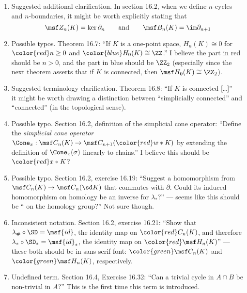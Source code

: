 \documentclass{fkletter}
\begin{document}
\begin{enumerate}
  \item Suggested additional clarification. In section 16.2, when we define
    $n$-cycles and $n$-boundaries, it might be worth explicitly stating that
    \[
      \msf Z_n(K) = \ker \partial_n \qquad \text{and} \qquad \msf B_n(K) =
      \im\partial_{n+1}
    \]
  \item Possible typos. Theorem 16.7: ``If $K$ is a one-point space, $H_n(K)
    \cong 0$ for $\color{red} n \geq 0$ and $\color{blue}H_0(K) \cong \ZZ$.'' I
    believe the part in red should be $n > 0$, and the part in blue should be
    $\ZZ_2$ (especially since the next theorem asserts that if $K$ is connected,
    then $\msf H_0(K) \cong \ZZ_2$).
  \item Suggested terminology clarification. Theorem 16.8: ``If $K$ is
    {\color{red} connected} [\ldots]'' --- it might be worth drawing a
    distinction between ``simplicially connected'' and ``connected'' (in the
    topological sense).
  \item Possible typo. Section 16.2, definition of the simplicial cone operator:
    ``Define the \emph{simplicial cone operator} $\Cone_x : \msf C_n(K) \to \msf
    C_{n+1}({\color{red}w*K})$ by extending the definition of $\Cone_x(\sigma)$
    linearly to chains.'' I believe this should be ${\color{red}x * K}$?
  \item Possible typo. Section 16.2, exercise 16.19: ``Suggest a homomorphism
    from $\msf C_n(K) \to \msf C_n(\sd K)$ that commutes with $\partial$. Could
    its induced homomorphism {\color{red} on homology} be an inverse for
    $\lambda_*$?'' --- seems like this should be ``{\color{green} on the
      homology group}?'' Not sure though.
  \item Inconsistent notation. Section 16.2, exercise 16.21: ``Show that
    $\lambda_\# \circ \SD = \msf{id}$, the identity map on $\color{red} C_n(K)$,
    and therefore $\lambda_* \circ \SD_* = \msf{id}_*$, the identity map on
    $\color{red} \msf H_n(K)$'' --- these both should be in sans-serif font:
    $\color{green}\msf C_n(K)$ and $\color{green} \msf H_n(K)$, respectively.
  \item Undefined term. Section 16.4, Exercise 16.32: ``Can a {\color{red}
      trivial cycle} in $A \cap B$ be {\color{red} non-trivial} in $A$?'' This
    is the first time this term is introduced.


\end{enumerate}
\end{document}
